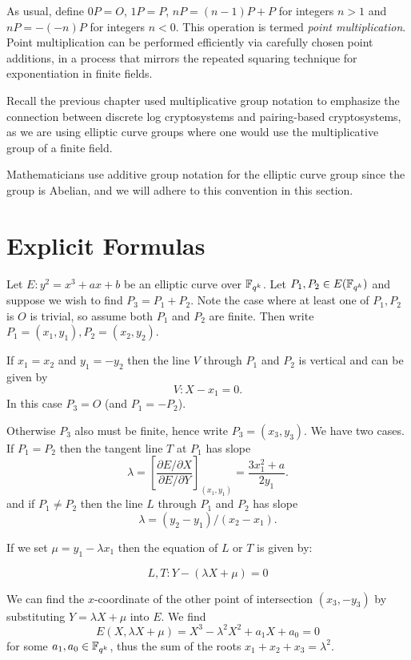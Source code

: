 As usual, define $0 P = O$, $1 P = P$,
$n P = (n-1)P + P$ for integers $n > 1$ and $n P = -(-n)P$ for integers
$n < 0$.
This operation is termed \emph{point multiplication}. Point multiplication can
be performed efficiently via carefully chosen point additions, in a process
that mirrors the repeated squaring technique for exponentiation in finite
fields.

Recall the previous chapter used multiplicative group notation to emphasize
the connection between discrete log cryptosystems and pairing-based
cryptosystems, as we are using elliptic curve groups where one would use
the multiplicative group of a finite field.

Mathematicians use additive group notation for the elliptic curve group
since the group is Abelian, and we will adhere to this convention in this
section.

\section {Explicit Formulas}

Let $E: y^2 = x^3 + ax + b$ be an elliptic curve over $\mathbb{F}_{q^k}$. Let
$P_1, P_2 \in E(\mathbb{F}_{q^k})$ and suppose
we wish to find $P_3 = P_1 + P_2$.
Note the case where at least one of $P_1, P_2$ is $O$ is trivial,
so assume both $P_1$ and $P_2$ are finite.
Then write $P_1 = (x_1, y_1), P_2 = (x_2, y_2)$.

If $x_1 = x_2$ and $y_1 = -y_2$
then the line $V$ through $P_1$ and $P_2$ is vertical and
can be given by
\[ V : X - x_1 = 0  . \]
In this case $P_3 = O$ (and $P_1 = -P_2$).

Otherwise $P_3$ also must be finite, hence write $P_3 = (x_3, y_3)$.
We have two cases. If $P_1 = P_2$ then the tangent line $T$ at
$P_1$
has slope
\[\lambda =
\left[ \frac{\partial E / \partial X}{\partial E/ \partial Y} \right]_{(x_1,y_1)}
= \frac{3x_1^2 + a}{2y_1} . \]
and if $P_1 \ne P_2$ then the line $L$ through $P_1$ and $P_2$ has slope
\[ \lambda = (y_2 - y_1)/(x_2 - x_1) . \]

If we set $\mu = y_1 - \lambda x_1$ then
the equation of $L$ or $T$ is given by:

\[ L, T :  Y - (\lambda X + \mu) = 0 \]

We can find the $x$-coordinate of the other point of intersection $(x_3, -y_3)$
by substituting $Y = \lambda X + \mu$ into $E$. We find
\[ E(X, \lambda X+\mu) = X^3 - \lambda^2 X^2 + a_1 X + a_0 = 0 \]
for some $a_1, a_0 \in \mathbb{F}_{q^k}$, thus the sum of the roots
$x_1 + x_2 + x_3 = \lambda^2$.

